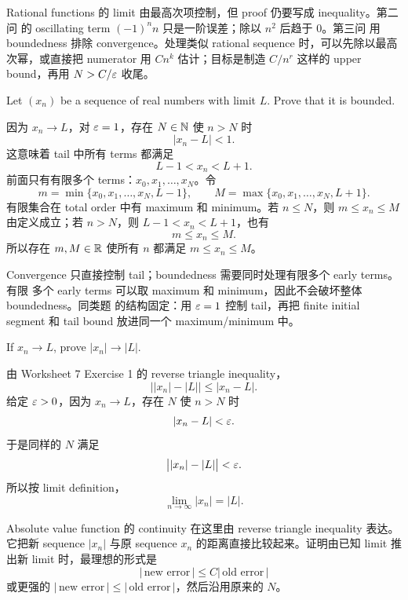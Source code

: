 \begin{explanation}
Rational functions 的 limit 由最高次项控制，但 proof 仍要写成 inequality。第二问
的 oscillating term \((-1)^n n\) 只是一阶误差；除以 \(n^2\) 后趋于 \(0\)。第三问
用 boundedness 排除 convergence。处理类似 rational sequence 时，可以先除以最高
次幂，或直接把 numerator 用 \(Cn^k\) 估计；目标是制造 \(C/n^r\) 这样的 upper
bound，再用 \(N>C/\varepsilon\) 收尾。
\end{explanation}

\begin{exerciseblock}
Let \((x_n)\) be a sequence of real numbers with limit \(L\). Prove that it is
bounded.
\end{exerciseblock}

\begin{solution}
因为 \(x_n\to L\)，对 \(\varepsilon=1\)，存在 \(N\in\mathbb{N}\) 使 \(n>N\) 时
\[
  |x_n-L|<1.
\]
这意味着 tail 中所有 terms 都满足
\[
  L-1<x_n<L+1.
\]
前面只有有限多个 terms：\(x_0,x_1,\ldots,x_N\)。令
\[
  m=\min\{x_0,x_1,\ldots,x_N,L-1\},
  \qquad
  M=\max\{x_0,x_1,\ldots,x_N,L+1\}.
\]
有限集合在 total order 中有 maximum 和 minimum。若 \(n\leq N\)，则
\(m\leq x_n\leq M\) 由定义成立；若 \(n>N\)，则 \(L-1<x_n<L+1\)，也有
\[
  m\leq x_n\leq M.
\]
所以存在 \(m,M\in\mathbb{R}\) 使所有 \(n\) 都满足 \(m\leq x_n\leq M\)。
\end{solution}

\begin{explanation}
Convergence 只直接控制 tail；boundedness 需要同时处理有限多个 early terms。有限
多个 early terms 可以取 maximum 和 minimum，因此不会破坏整体 boundedness。同类题
的结构固定：用 \(\varepsilon=1\) 控制 tail，再把 finite initial segment 和 tail bound
放进同一个 maximum/minimum 中。
\end{explanation}

\begin{exerciseblock}
If \(x_n\to L\), prove \(|x_n|\to |L|\).
\end{exerciseblock}

\begin{solution}
由 Worksheet 7 Exercise 1 的 reverse triangle inequality，
\[
  \bigl||x_n|-|L|\bigr|\leq |x_n-L|.
\]
给定 \(\varepsilon>0\)，因为 \(x_n\to L\)，存在 \(N\) 使 \(n>N\) 时
\[
  |x_n-L|<\varepsilon.
\]
于是同样的 \(N\) 满足
\[
  \bigl||x_n|-|L|\bigr|<\varepsilon.
\]
所以按 limit definition，
\[
  \lim_{n\to\infty}|x_n|=|L|.
\]
\end{solution}

\begin{explanation}
Absolute value function 的 continuity 在这里由 reverse triangle inequality 表达。
它把新 sequence \(|x_n|\) 与原 sequence \(x_n\) 的距离直接比较起来。证明由已知
limit 推出新 limit 时，最理想的形式是
\[
  |\,\text{new error}\,|\leq C|\,\text{old error}\,|
\]
或更强的 \(|\,\text{new error}\,|\leq |\,\text{old error}\,|\)，然后沿用原来的
\(N\)。
\end{explanation}

